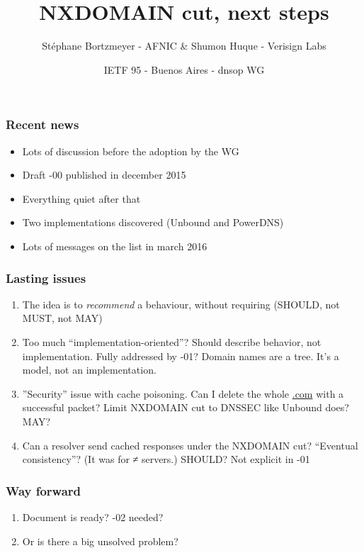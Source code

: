 \documentclass[ignorenonframetext]{beamer}
\title{NXDOMAIN cut, next steps}
\author{Stéphane Bortzmeyer - AFNIC \& Shumon Huque - Verisign Labs}
\date{IETF 95 - Buenos Aires - dnsop WG}
\begin{document}
\begin{frame}
\maketitle  
\end{frame}

\begin{frame}
  \frametitle{Recent news}
  \begin{itemize}
  \item<2->Lots of discussion before the adoption by the WG
  \item<3->Draft -00 published in december 2015
  \item<4->Everything quiet after that
  \item<5->Two implementations discovered (Unbound and PowerDNS)
  \item<6->Lots of messages on the list in march 2016  
  \end{itemize}
\end{frame}

\begin{frame}
  \frametitle{Lasting issues}
  \begin{enumerate}
  \item<1->The idea is to \emph{recommend} a behaviour, without
    requiring (SHOULD, not MUST, not MAY)
  \item<2->Too much ``implementation-oriented''? Should describe
    behavior, not implementation. Fully addressed by -01? Domain names
    are a tree. It's a model, not an implementation.
  \item<3->''Security'' issue with cache poisoning. Can I delete
    the whole \url{.com} with a successful packet? Limit NXDOMAIN cut to
    DNSSEC like Unbound does? MAY?
   \item<4->Can a resolver send cached responses under the NXDOMAIN
     cut? ``Eventual consistency''? (It was for ≠ servers.) SHOULD?
     Not explicit in -01
  \end{enumerate}
\end{frame}

\begin{frame}
  \frametitle{Way forward}
  \begin{enumerate}
  \item<2->Document is ready? -02 needed?
  \item<3->Or is there a big unsolved problem?
  \end{enumerate}
\end{frame}
\end{document}
